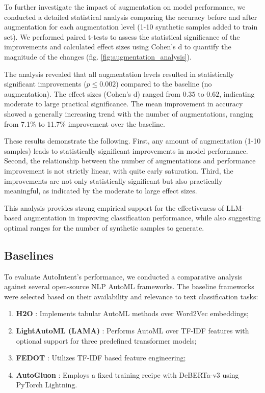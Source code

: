 To further investigate the impact of augmentation on model performance, we conducted a detailed statistical analysis comparing the accuracy before and after augmentation for each augmentation level (1-10 synthetic samples added to train set). We performed paired t-tests to assess the statistical significance of the improvements and calculated effect sizes using Cohen's d to quantify the magnitude of the changes (fig. \ref{fig:augmentation_analysis}).

The analysis revealed that all augmentation levels resulted in statistically significant improvements ($p \leq 0.002$) compared to the baseline (no augmentation). The effect sizes (Cohen's d) ranged from $0.35$ to $0.62$, indicating moderate to large practical significance. The mean improvement in accuracy showed a generally increasing trend with the number of augmentations, ranging from 7.1\% to 11.7\% improvement over the baseline.

These results demonstrate the following. First, any amount of augmentation (1-10 samples) leads to statistically significant improvements in model performance. Second, the relationship between the number of augmentations and performance improvement is not strictly linear, with quite early saturation. Third, the improvements are not only statistically significant but also practically meaningful, as indicated by the moderate to large effect sizes.

This analysis provides strong empirical support for the effectiveness of LLM-based augmentation in improving classification performance, while also suggesting optimal ranges for the number of synthetic samples to generate.

\subsection{Baselines}\label{sec:baselines_exps}

To evaluate AutoIntent's performance, we conducted a comparative analysis against several open-source NLP AutoML frameworks. The baseline frameworks were selected based on their availability and relevance to text classification tasks:

\begin{enumerate}
    \item \textbf{H2O} \cite{ledell2020h2o}: Implements tabular AutoML methods over Word2Vec embeddings;
    \item \textbf{LightAutoML (LAMA)} \cite{vakhrushev2022lightautomlautomlsolutionlarge}: Performs AutoML over TF-IDF features with optional support for three predefined transformer models;
    \item \textbf{FEDOT} \cite{nikitin2021automated}: Utilizes TF-IDF based feature engineering;
    \item \textbf{AutoGluon} \cite{tang2024autogluonmultimodalautommsuperchargingmultimodal}: Employs a fixed training recipe with DeBERTa-v3 \cite{he2021debertav3} using PyTorch Lightning.
\end{enumerate}

